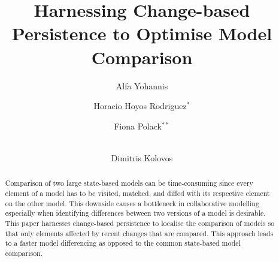 \documentclass{llncs}
\begin{document}
\renewcommand{\thelstlisting}{\arabic{lstlisting}}
\renewcommand{\labelitemi}{$\bullet$}
\newcommand{\dk}[1]{\textbf{[DK: #1]}}

\title{Harnessing Change-based Persistence to Optimise Model Comparison}
%
%
\author{
Alfa Yohannis \and Horacio Hoyos Rodriguez$^{*}$ \and Fiona Polack$^{**}$ \and \\ Dimitris Kolovos
}

%
%



\maketitle      %

\begin{abstract}
Comparison of two large state-based models can be time-consuming since every element of a model has to be visited, matched, and diffed with its respective element on the other model. This downside causes a bottleneck in collaborative modelling especially when identifying differences between two versions of a model is desirable. This paper harnesses change-based persistence to localise the comparison of models so that only elements affected by recent changes that are compared. This approach leads to a faster model differencing as opposed to the common state-based model comparison. 
\end{abstract}
\end{document}
